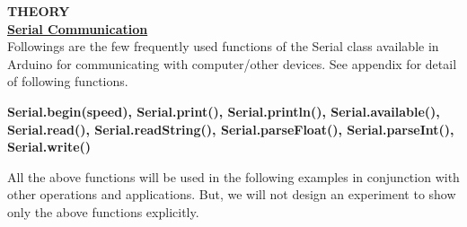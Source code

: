 \documentclass[12pt,a4paper]{article}
\begin{document}
\begin{justify}
\textbf{\large THEORY}\\[3pt]
\textbf {\underline {Serial Communication}}\\[3pt]
Followings are the few frequently used functions of the Serial class available in Arduino for communicating with computer/other devices. See appendix for detail of following functions.
\begin{center}
\textbf { Serial.begin(speed), Serial.print(),  Serial.println(), Serial.available(), Serial.read(), Serial.readString(), Serial.parseFloat(), Serial.parseInt(), Serial.write()} 
\end{center}
\noindent All the above functions will be used in the following examples in conjunction with other operations and applications. But, we will not design an experiment to show only the above functions explicitly.\\


\end{justify}
\end{document}
